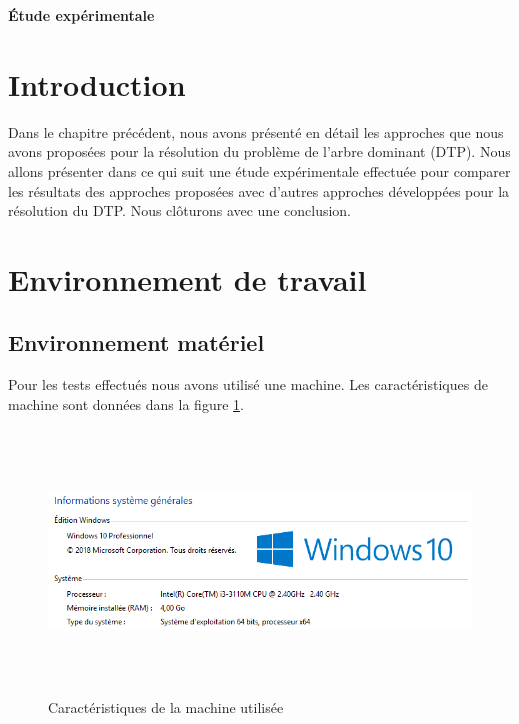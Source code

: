 


\cleardoublepage


\setcounter{chapter}{5}
\setcounter{section}{0}
\setcounter{figure}{0}

\begin{center}
	\Huge\textbf{Étude expérimentale}
\end{center}

\section{Introduction}
Dans le chapitre précédent, nous avons présenté en détail les approches que nous avons proposées pour la résolution du problème de l’arbre dominant (DTP). Nous allons présenter dans ce qui suit une étude expérimentale effectuée pour comparer les résultats des approches proposées avec d’autres approches développées pour la résolution du DTP. Nous clôturons avec une conclusion.


\section{Environnement de travail}

\subsection{Environnement matériel}
Pour les tests effectués nous avons utilisé une machine. Les caractéristiques de  machine sont données dans la figure \ref{fig:CMU}.

\begin{figure}[H]
	\centering
	\includegraphics[width=16cm,height=7cm]{Chap5/1.png}
	\caption{Caractéristiques de la machine utilisée}
	\label{fig:CMU}
\end{figure}

